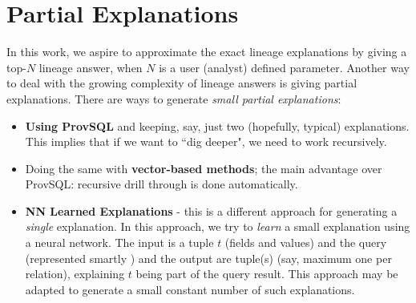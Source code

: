 
\section{Partial Explanations} 
In this work, we aspire to approximate the exact lineage explanations by giving a top-$N$ lineage answer, when $N$ is a user (analyst) defined parameter. Another way to deal with the growing complexity of lineage answers is giving partial explanations. 
There are ways to generate \textit{small partial explanations}:
\begin{itemize}
    \item \textbf{Using ProvSQL} and keeping, say, just two (hopefully, typical) explanations. This implies that if we want to ``dig deeper", we need to work recursively.
    \item Doing the same with \textbf{vector-based methods}; the main advantage over ProvSQL: recursive drill through is done automatically.
    \item \textbf{NN Learned Explanations} - this is a different approach for generating a \textit{single} explanation. In this approach, we try to \textit{learn} a small explanation using a neural network. The input is a tuple $t$ (fields and values) and the query (represented smartly \cite {DBLP:conf/cidr/KipfKRLBK19,DBLP:journals/corr/abs-2004-07009}) and the output are tuple(s) (say, maximum one per relation), explaining $t$ being part of the query result. This approach may be adapted to generate a small constant number of such explanations.
\end{itemize}


